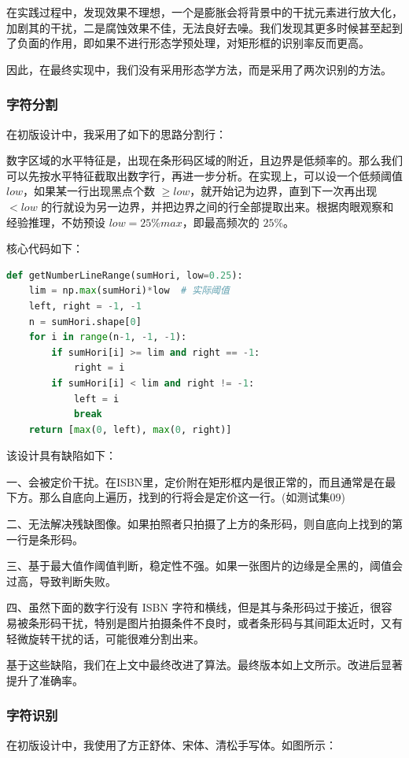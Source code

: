 \documentclass{ctexart}
\begin{document}
在实践过程中，发现效果不理想，一个是膨胀会将背景中的干扰元素进行放大化，加剧其的干扰，二是腐蚀效果不佳，无法良好去噪。我们发现其更多时候甚至起到了负面的作用，即如果不进行形态学预处理，对矩形框的识别率反而更高。

因此，在最终实现中，我们没有采用形态学方法，而是采用了两次识别的方法。

\subsubsection{字符分割}
在初版设计中，我采用了如下的思路分割行：

数字区域的水平特征是，出现在条形码区域的附近，且边界是低频率的。那么我们可以先按水平特征截取出数字行，再进一步分析。在实现上，可以设一个低频阈值 $low$，如果某一行出现黑点个数 $\ge low$，就开始记为边界，直到下一次再出现 $< low$ 的行就设为另一边界，并把边界之间的行全部提取出来。根据肉眼观察和经验推理，不妨预设 $low=25\%max$，即最高频次的 $25\%$。

核心代码如下：
\begin{lstlisting}[language=python]
def getNumberLineRange(sumHori, low=0.25):
    lim = np.max(sumHori)*low  # 实际阈值
    left, right = -1, -1
    n = sumHori.shape[0]
    for i in range(n-1, -1, -1):
        if sumHori[i] >= lim and right == -1:
            right = i
        if sumHori[i] < lim and right != -1:
            left = i
            break
    return [max(0, left), max(0, right)]
\end{lstlisting}

该设计具有缺陷如下：

一、会被定价干扰。在ISBN里，定价附在矩形框内是很正常的，而且通常是在最下方。那么自底向上遍历，找到的行将会是定价这一行。(如测试集09)

二、无法解决残缺图像。如果拍照者只拍摄了上方的条形码，则自底向上找到的第一行是条形码。

三、基于最大值作阈值判断，稳定性不强。如果一张图片的边缘是全黑的，阈值会过高，导致判断失败。

四、虽然下面的数字行没有 ISBN 字符和横线，但是其与条形码过于接近，很容易被条形码干扰，特别是图片拍摄条件不良时，或者条形码与其间距太近时，又有轻微旋转干扰的话，可能很难分割出来。

基于这些缺陷，我们在上文中最终改进了算法。最终版本如上文所示。改进后显著提升了准确率。

\subsubsection{字符识别}
在初版设计中，我使用了方正舒体、宋体、清松手写体。如图所示：
\end{document}

